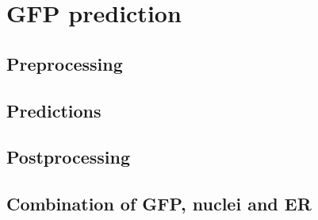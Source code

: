 \section{GFP prediction}
    \subsection{Preprocessing}
        
    \subsection{Predictions}
        
    \subsection{Postprocessing}
        
    \subsection{Combination of GFP, nuclei and ER}
        

